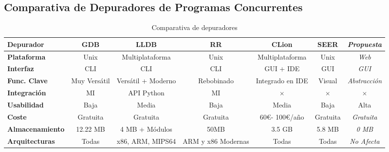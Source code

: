 \subsection{Comparativa de Depuradores de Programas Concurrentes}{\label{subsec:comparativa-depuradores-concurrentes}}

\begin{table}[htb]
    \begin{adjustbox}{max width=\textwidth}  %
        \begin{threeparttable}[htb]
            \begin{tabular}{lcccccc}
                \toprule
                \textbf{Depurador} & GDB & LLDB & RR & CLion & SEER & \textit{Propuesta} \\ \hline
                \textbf{Plataforma}      & Unix     & Multiplataforma & Unix     & Multiplataforma & Unix       & \textit{Web}        \\
                \textbf{Interfaz}        & CLI      & CLI             & CLI      & GUI + IDE       & GUI        & \textit{GUI}        \\
                \textbf{Func. Clave}     & Muy Versátil     & Versátil + Moderno           & Rebobinado     & Integrado en IDE           & Visual      & \textit{Abstracción} \\
                \textbf{Integración}     & MI    & API Python            & MI    & $\times$            & $\times$       & $\times$ \\              
                \textbf{Usabilidad}      & Baja     & Media      & Baja     & Media      & Baja      & Alta       \\
                \textbf{Coste}           & Gratuita & Gratuita        & Gratuita & 60\euro - 100\euro/año   & Gratuita   & \textit{Gratuita}   \\
                \textbf{Almacenamiento}  & 12.22 MB & 4 MB + Módulos  & 50MB     & 3.5 GB          & 5.8 MB     & \textit{0 MB}       \\
                \textbf{Arquitecturas}   & Todas & x86, ARM, MIPS64  & ARM y x86 Modernas     & Todas          & Todas     & \textit{No Afecta}       \\ \bottomrule
            \end{tabular}
        \end{threeparttable}
    \end{adjustbox}
    \caption{Comparativa de depuradores}
    \label{tab:comparativa-depuradores}
\end{table}

